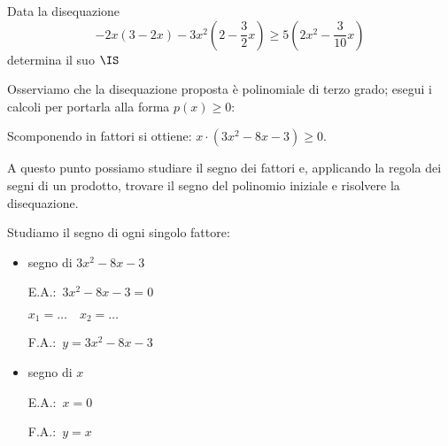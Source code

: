 \begin{esempio}
Data la disequazione
\[-2x(3-2x)-3x^2\left(2-\dfrac{3}{2}x\right) \ge
  5\left(2x^2-\dfrac{3}{10}x\right)\]
determina il suo \(\IS\)

Osserviamo che la disequazione proposta è polinomiale di terzo grado;
esegui i calcoli per portarla alla forma \(p(x)\ge 0\):
\vspace{3em}

Scomponendo in fattori si ottiene: \(x\cdot (3x^2-8x-3)\ge 0\).

A questo punto possiamo studiare il segno dei fattori e, applicando la regola
dei segni di un prodotto, trovare il segno del polinomio iniziale e risolvere
la disequazione.

Studiamo il segno di ogni singolo fattore:
\begin{itemize}

 \item segno di \(3x^2-8x-3\)\\
 \begin{minipage}{.35\textwidth}
  E.A.:~\(3x^2-8x-3=0\)

  \(x_1=\dots \quad x_2=\dots\)
 \end{minipage}
 \begin{minipage}{.25\textwidth}
  F.A.:~\(y=3x^2-8x-3\)
 \end{minipage}
 \begin{minipage}{.38\textwidth}
  \begin{inaccessibleblock}
  \parabolaamadma{}{}
\end{inaccessibleblock}
 \end{minipage}

 \item  segno di \(x\)\\
 \begin{minipage}{.35\textwidth}
  E.A.:~\(x=0\)
  \vspace{1.8em}
 \end{minipage}
 \begin{minipage}{.25\textwidth}
  F.A.:~\(y=x\)
  \vspace{1.8em}
 \end{minipage}
 \begin{minipage}{.38\textwidth}
  \begin{inaccessibleblock}
\end{inaccessibleblock}
 \end{minipage}


\end{itemize}
\end{esempio}
